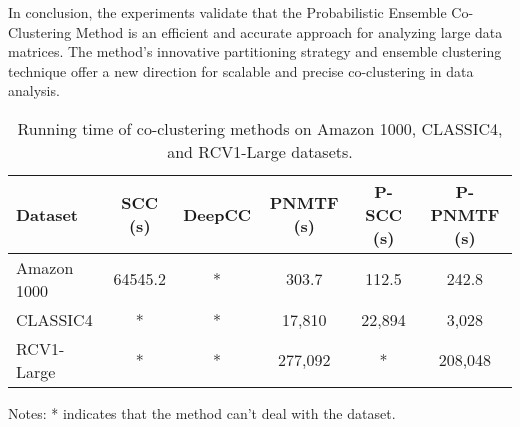 In conclusion, the experiments validate that the Probabilistic Ensemble Co-Clustering Method is an efficient and accurate approach for analyzing large data matrices. The method's innovative partitioning strategy and ensemble clustering technique offer a new direction for scalable and precise co-clustering in data analysis.

\begin{table*}[htbp]
    \centering
    \caption{Running time of co-clustering methods on Amazon 1000, CLASSIC4, and RCV1-Large datasets.}
    \label{tab:running-time}
    \begin{tabular}{@{} l ccccc @{}}
        \toprule
        Dataset     & SCC (s) & DeepCC & PNMTF (s) & P-SCC (s) & P-PNMTF (s) \\
        \midrule
        Amazon 1000 & 64545.2 & *      & 303.7     & 112.5     & 242.8       \\
        CLASSIC4    & *       & *      & 17,810    & 22,894    & 3,028       \\
        RCV1-Large  & *       & *      & 277,092   & *         & 208,048     \\
        \bottomrule
    \end{tabular}
    \begin{tablenotes}
        \small
        \item Notes: * indicates that the method can't deal with the dataset.
    \end{tablenotes}
\end{table*}

